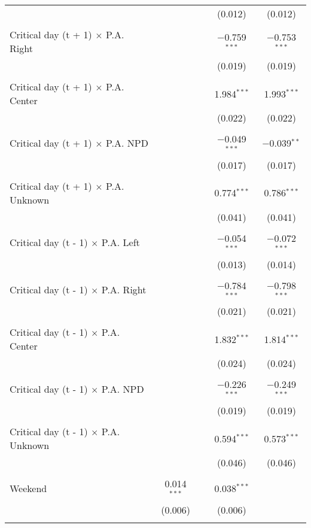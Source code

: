 \documentclass[
]{article}
\begin{document}
\begin{table}[!htbp]
{\begin{tabular}{@{\extracolsep{5pt}}lcccc}
  &  &  & (0.012) & (0.012) \\ 
  & & & & \\ 
 Critical day (t + 1) $\times$ P.A. Right &  &  & $-$0.759$^{***}$ & $-$0.753$^{***}$ \\ 
  &  &  & (0.019) & (0.019) \\ 
  & & & & \\ 
 Critical day (t + 1) $\times$ P.A. Center &  &  & 1.984$^{***}$ & 1.993$^{***}$ \\ 
  &  &  & (0.022) & (0.022) \\ 
  & & & & \\ 
 Critical day (t + 1) $\times$ P.A. NPD &  &  & $-$0.049$^{***}$ & $-$0.039$^{**}$ \\ 
  &  &  & (0.017) & (0.017) \\ 
  & & & & \\ 
 Critical day (t + 1) $\times$ P.A. Unknown &  &  & 0.774$^{***}$ & 0.786$^{***}$ \\ 
  &  &  & (0.041) & (0.041) \\ 
  & & & & \\ 
 Critical day (t - 1) $\times$ P.A. Left &  &  & $-$0.054$^{***}$ & $-$0.072$^{***}$ \\ 
  &  &  & (0.013) & (0.014) \\ 
  & & & & \\ 
 Critical day (t - 1) $\times$ P.A. Right &  &  & $-$0.784$^{***}$ & $-$0.798$^{***}$ \\ 
  &  &  & (0.021) & (0.021) \\ 
  & & & & \\ 
 Critical day (t - 1) $\times$ P.A. Center &  &  & 1.832$^{***}$ & 1.814$^{***}$ \\ 
  &  &  & (0.024) & (0.024) \\ 
  & & & & \\ 
 Critical day (t - 1) $\times$ P.A. NPD &  &  & $-$0.226$^{***}$ & $-$0.249$^{***}$ \\ 
  &  &  & (0.019) & (0.019) \\ 
  & & & & \\ 
 Critical day (t - 1) $\times$ P.A. Unknown &  &  & 0.594$^{***}$ & 0.573$^{***}$ \\ 
  &  &  & (0.046) & (0.046) \\ 
  & & & & \\ 
 Weekend & 0.014$^{***}$ &  & 0.038$^{***}$ &  \\ 
  & (0.006) &  & (0.006) &  \\ 
  & & & & \\ 

\end{tabular}}
\end{table}
\end{document}
